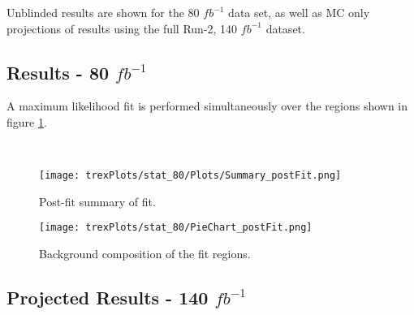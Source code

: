Unblinded results are shown for the 80 $fb^{-1}$ data set, as well as MC only projections of results using the full Run-2, 140 $fb^{-1}$ dataset.

\subsection{Results - 80 $fb^{-1}$}
\label{sec:res80}

A maximum likelihood fit is performed simultaneously over the regions shown in figure \ref{fig:sigRegions80}.

\begin{figure}[h!]
    \\
    \caption{}
    \label{fig:sigRegions80}
\end{figure}

\begin{figure}[h!]
    \center
    \texttt{[image: trexPlots/stat\_80/Plots/Summary\_postFit.png]}
    \caption{Post-fit summary of fit.}                                                                          
    \label{fig:Summary80}
\end{figure}

\begin{figure}[h!]
    \centering
    \texttt{[image: trexPlots/stat\_80/PieChart\_postFit.png]}
    \caption{Background composition of the fit regions.}
    \label{fig:pieChart80}
\end{figure} 


\subsection{Projected Results - 140 $fb^{-1}$}   
\label{sec:res140}

\begin{figure}[h!]
    \\
    \caption{}
    \label{fig:sigRegions140}
\end{figure}

